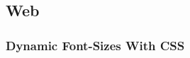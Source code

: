 \documentclass[9pt,svgnames,x11names]{beamer}
\begin{document}
\subsection{Web}

\subsubsection{Dynamic Font-Sizes With CSS}


\end{document}

